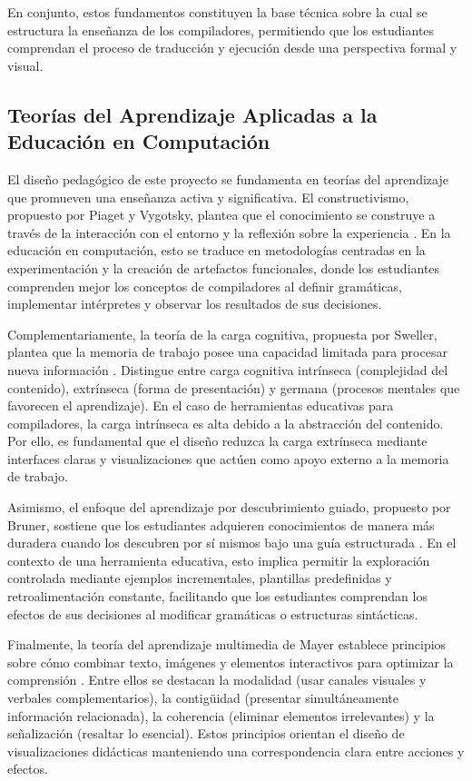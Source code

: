 En conjunto, estos fundamentos constituyen la base técnica sobre la cual se estructura la enseñanza de los compiladores, permitiendo que los estudiantes comprendan el proceso de traducción y ejecución desde una perspectiva formal y visual.

\subsection{Teorías del Aprendizaje Aplicadas a la Educación en Computación}

El diseño pedagógico de este proyecto se fundamenta en teorías del aprendizaje que promueven una enseñanza activa y significativa. El constructivismo, propuesto por Piaget y Vygotsky, plantea que el conocimiento se construye a través de la interacción con el entorno y la reflexión sobre la experiencia \cite{benitez2023constructivismo}. En la educación en computación, esto se traduce en metodologías centradas en la experimentación y la creación de artefactos funcionales, donde los estudiantes comprenden mejor los conceptos de compiladores al definir gramáticas, implementar intérpretes y observar los resultados de sus decisiones.

Complementariamente, la teoría de la carga cognitiva, propuesta por Sweller, plantea que la memoria de trabajo posee una capacidad limitada para procesar nueva información \cite{sweller2024cognitive}. Distingue entre carga cognitiva intrínseca (complejidad del contenido), extrínseca (forma de presentación) y germana (procesos mentales que favorecen el aprendizaje). En el caso de herramientas educativas para compiladores, la carga intrínseca es alta debido a la abstracción del contenido. Por ello, es fundamental que el diseño reduzca la carga extrínseca mediante interfaces claras y visualizaciones que actúen como apoyo externo a la memoria de trabajo.

Asimismo, el enfoque del aprendizaje por descubrimiento guiado, propuesto por Bruner, sostiene que los estudiantes adquieren conocimientos de manera más duradera cuando los descubren por sí mismos bajo una guía estructurada \cite{hernandez2022aprendizaje}. En el contexto de una herramienta educativa, esto implica permitir la exploración controlada mediante ejemplos incrementales, plantillas predefinidas y retroalimentación constante, facilitando que los estudiantes comprendan los efectos de sus decisiones al modificar gramáticas o estructuras sintácticas.

Finalmente, la teoría del aprendizaje multimedia de Mayer establece principios sobre cómo combinar texto, imágenes y elementos interactivos para optimizar la comprensión \cite{betancur2023aplicacion}. Entre ellos se destacan la modalidad (usar canales visuales y verbales complementarios), la contigüidad (presentar simultáneamente información relacionada), la coherencia (eliminar elementos irrelevantes) y la señalización (resaltar lo esencial). Estos principios orientan el diseño de visualizaciones didácticas manteniendo una correspondencia clara entre acciones y efectos.

